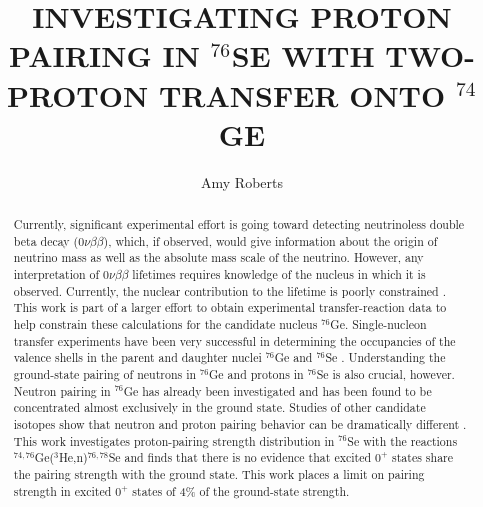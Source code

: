 \documentclass[textrefs,final,noinfo,12pt]{nddiss2e}
\newcommand{\Ge}[1]{$^{#1}$Ge\xspace}
\newcommand{\Se}[1]{$^{#1}$Se\xspace}
\newcommand{\reaction}{$^{74,76}$Ge($^3$He,n)$^{76,78}$Se\xspace}
\newcommand{\zvbb}{$0\nu\beta\beta$\xspace}
\newcommand{\zp}{$0^+$\xspace}
\begin{document}
\frontmatter

\title{INVESTIGATING PROTON PAIRING IN $^{76}$SE WITH TWO-PROTON TRANSFER ONTO $^{74}$GE}
\author{Amy Roberts}

\maketitle
%
%

\makecopyright

\begin{abstract}
Currently, significant experimental effort is going toward detecting neutrinoless double beta decay (\zvbb), which, if observed, would give information about the origin of neutrino mass as well as the absolute mass scale of the neutrino.  However, any interpretation of \zvbb lifetimes requires knowledge of the nucleus in which it is observed.  Currently, the nuclear contribution to the lifetime is poorly constrained \citep{zvbbReviewSchwingenheuer}.  This work is part of a larger effort to obtain experimental transfer-reaction data to help constrain these calculations for the candidate nucleus \Ge{76}.  Single-nucleon transfer experiments have been very successful in determining the occupancies of the valence shells in the parent and daughter nuclei \Ge{76} and \Se{76} \citep{valenceProtons,valenceNeutrons}.  Understanding the ground-state pairing of neutrons in \Ge{76} and protons in \Se{76} is also crucial, however.  Neutron pairing in \Ge{76} has already been investigated \cite{neutronPairsGermanium} and has been found to be concentrated almost exclusively in the ground state.  Studies of other candidate isotopes show that neutron and proton pairing behavior can be dramatically different \cite{protonPairsTellurium,neutronPairsTellurium}.  This work investigates proton-pairing strength distribution in \Se{76} with the reactions \reaction and finds that there is no evidence that excited \zp states share the pairing strength with the ground state.  This work places a limit on pairing strength in excited \zp states of 4\% of the ground-state strength. 

\end{abstract}
\end{document}
